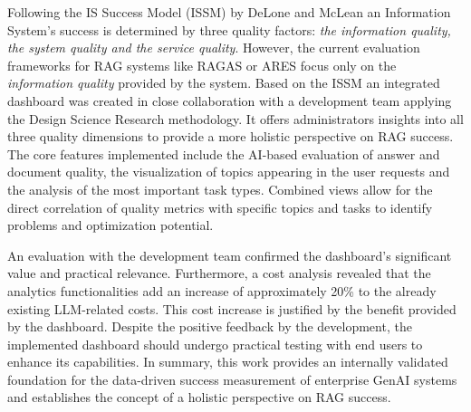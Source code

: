 \documentclass[
	english,
	ruledheaders=section,%
	class=report,%
	thesis={type=bachelor},%
	accentcolor=1b,%
	custommargins=true,%
	marginpar=false,%
	parskip=half-,%
	fontsize=11pt,%
	DIV=14,
]{tudapub}
\begin{document}
Following the IS Success Model (ISSM) by DeLone and McLean an Information System's success is determined by three quality factors: \textit{the information quality, the system quality and the service quality}. However, the current evaluation frameworks for RAG systems like RAGAS or ARES focus only on the \textit{information quality} provided by the system. Based on the ISSM an integrated dashboard was created in close collaboration with a development team applying the Design Science Research methodology. It offers administrators insights into all three quality dimensions to provide a more holistic perspective on RAG success. The core features implemented include the AI-based evaluation of answer and document quality, the visualization of topics appearing in the user requests and the analysis of the most important task types. Combined views allow for the direct correlation of quality metrics with specific topics and tasks to identify problems and optimization potential.

An evaluation with the development team confirmed the dashboard's significant value and practical relevance. Furthermore, a cost analysis revealed that the analytics functionalities add an increase of approximately 20\% to the already existing LLM-related costs. This cost increase is justified by the benefit provided by the dashboard. Despite the positive feedback by the development, the implemented dashboard should undergo practical testing with end users to enhance its capabilities. In summary, this work provides an internally validated foundation for the data-driven success measurement of enterprise GenAI systems and establishes the concept of a holistic perspective on RAG success.

\tableofcontents




\listoffigures
{}           %
\end{document}
